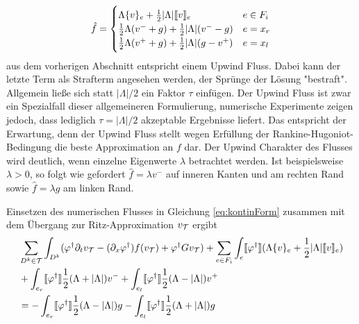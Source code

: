 \begin{equation}
  \begin{aligned}
    \hat{f} = \begin{cases}
    \Lambda\{ v \}_e + \frac{1}{2}|\Lambda|\llbracket v \rrbracket_e & e\in F_i \\
    \frac{1}{2}\Lambda(v^- + g) + \frac{1}{2}|\Lambda|(v^- - g)   & e=x_r \\
    \frac{1}{2}\Lambda(v^+ + g) + \frac{1}{2}|\Lambda|(g - v^+)   & e=x_l
  \end{cases}
  \end{aligned}
\end{equation}
aus dem vorherigen Abschnitt entspricht einem Upwind Fluss. Dabei kann der letzte Term als Strafterm angesehen werden, der Sprünge der Lösung "bestraft". Allgemein ließe sich statt $|\Lambda|/2$ ein Faktor $\tau$ einfügen. Der Upwind Fluss ist zwar ein Spezialfall dieser allgemeineren Formulierung, numerische Experimente zeigen jedoch, dass lediglich $\tau=|\Lambda|/2$ akzeptable Ergebnisse liefert. Das entspricht der Erwartung, denn der Upwind Fluss stellt wegen Erfüllung der Rankine-Hugoniot-Bedingung die beste Approximation an $f$ dar. Der Upwind Charakter des Flusses wird deutlich, wenn einzelne Eigenwerte $\lambda$ betrachtet werden. Ist beispielsweise $\lambda>0$, so folgt wie gefordert $\hat{f}=\lambda v^-$ auf inneren Kanten und am rechten Rand sowie $\hat{f}=\lambda g$ am linken Rand.

Einsetzen des numerischen Flusses in Gleichung \eqref{eq:kontinForm} zusammen mit dem Übergang zur Ritz-Approximation $v_{\mathcal{T}}$ ergibt
\begin{equation}
  \begin{aligned}
    &\sum_{D^k\in\mathcal{T}}\int_{D^k} (\varphi^{\dagger} \partial_t v_{\mathcal{T}} - (\partial_x \varphi^{\dagger}) f(v_{\mathcal{T}}) + \varphi^{\dagger} G v_{\mathcal{T}})
    + \sum_{e\in F_i}\int_{e}\llbracket \varphi^{\dagger} \rrbracket (\Lambda\{ v \}_e + \frac{1}{2}|\Lambda|\llbracket v \rrbracket_e) \\
    &+ \int_{e_r} \llbracket \varphi^{\dagger} \rrbracket \frac{1}{2}(\Lambda + |\Lambda|)v^-
    + \int_{e_l} \llbracket \varphi^{\dagger} \rrbracket \frac{1}{2}(\Lambda - |\Lambda|)v^+ \\
    &= -\int_{e_r} \llbracket \varphi^{\dagger} \rrbracket \frac{1}{2}(\Lambda - |\Lambda|)g
       -\int_{e_l} \llbracket \varphi^{\dagger} \rrbracket \frac{1}{2}(\Lambda + |\Lambda|)g
  \end{aligned}
\end{equation}




